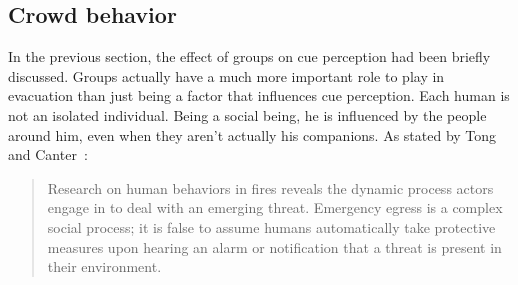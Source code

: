 \subsection{Crowd behavior}
\label{LiteratureReview:CrowdBehavior}
In the previous section, the effect of groups on cue perception had been briefly discussed. Groups actually have a much more important role to play in evacuation than just being a factor that influences cue perception. Each human is not an isolated individual. Being a social being, he is influenced by the people around him, even when they aren't actually his companions. As stated by Tong and Canter~\cite{Tong:1985wn}:
\begin{quote}
Research on human behaviors in fires reveals the dynamic process actors engage in to deal with an emerging threat. Emergency egress is a complex social process; it is false to assume humans automatically take protective measures upon hearing an alarm or notification that a threat is present in their environment.
\end{quote}

